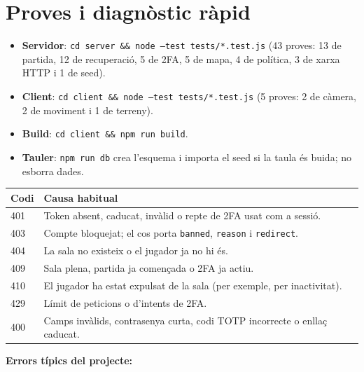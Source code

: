 \documentclass[10pt,a4paper]{article}
\begin{document}
\section{Proves i diagnòstic ràpid}

\begin{itemize}[nosep]
  \item \textbf{Servidor}: \texttt{cd server \&\& node --test tests/*.test.js} (43
        proves: 13 de partida, 12 de recuperació, 5 de 2FA, 5 de mapa, 4 de política,
        3 de xarxa HTTP i 1 de seed).
  \item \textbf{Client}: \texttt{cd client \&\& node --test tests/*.test.js} (5 proves:
        2 de càmera, 2 de moviment i 1 de terreny).
  \item \textbf{Build}: \texttt{cd client \&\& npm run build}.
  \item \textbf{Tauler}: \texttt{npm run db} crea l'esquema i importa el seed si la
        taula és buida; no esborra dades.
\end{itemize}

\begin{table}[ht]
\small
\begin{tabularx}{\textwidth}{@{}p{1.2cm}X@{}}
\toprule
\textbf{Codi} & \textbf{Causa habitual} \\
\midrule
401 & Token absent, caducat, invàlid o repte de 2FA usat com a sessió. \\
403 & Compte bloquejat; el cos porta \texttt{banned}, \texttt{reason} i
\texttt{redirect}. \\
404 & La sala no existeix o el jugador ja no hi és. \\
409 & Sala plena, partida ja començada o 2FA ja actiu. \\
410 & El jugador ha estat expulsat de la sala (per exemple, per inactivitat). \\
429 & Límit de peticions o d'intents de 2FA. \\
400 & Camps invàlids, contrasenya curta, codi TOTP incorrecte o enllaç caducat. \\
\bottomrule
\end{tabularx}
\end{table}

\textbf{Errors típics del projecte:}
\end{document}
